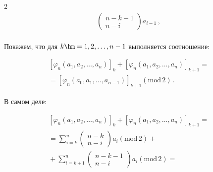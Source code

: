 \begin{multicols}{2}
\begin{align*}
\begin{pmatrix}
  n-k-1\\ n-i\end{pmatrix} a_{i-1}\,,\\


  \end{align*}


  


  Покажем, что для $k\hm= 1,2,\ldots , n-1$ выполняется соотношение:


  


  \noindent


  \begin{multline*}


  \left[ \varphi_n\left( a_1,a_2,\ldots , a_n\right)\right]_k+


  \left[ \varphi_n\left( a_1,a_2,\ldots , a_n\right) \right]_{k+1}={}\\


  {}=\left[ \varphi_n\left( a_0,a_1,\ldots , a_{n-1}\right)\right]_{k+1} 


  (\mathrm{mod}\,2)\,.


  \end{multline*}


  


  В самом деле: 


  


  \noindent


  \begin{multline*}


  \left[ \varphi_n\left( a_1,a_2,\ldots , a_n\right)\right]_k+ 


  \left[ \varphi_n\left( a_1,a_2,\ldots , a_n\right) \right]_{k+1}={}\\


  {}=\sum\limits^n_{i=k} \begin{pmatrix} n-k\\ n-i\end{pmatrix} 


  a_i\left( \mathrm{mod}\,2\right)+{}\\


  {} +\sum\limits^n_{i=k+1} \begin{pmatrix} n-k-1\\ n-i \end{pmatrix} 


  a_i \left(\mathrm{mod}\,2\right)={}


  \end{multline*}



\end{multicols}
